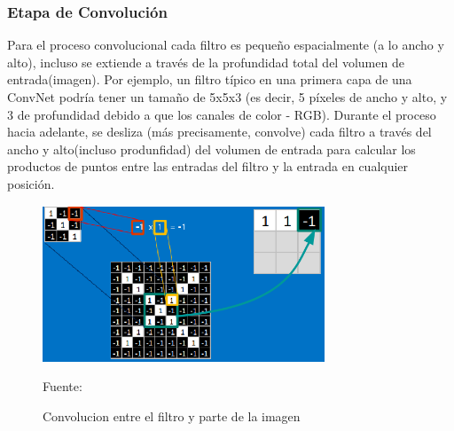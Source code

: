 		\subsubsection {Etapa de Convolución} 
		  
		Para el proceso convolucional cada filtro es pequeño espacialmente (a lo ancho y alto), incluso se extiende a través de la profundidad total del volumen de entrada(imagen). Por ejemplo, un filtro típico en una primera capa de una ConvNet podría tener un tamaño de 5x5x3 (es decir, 5 píxeles de ancho y alto, y 3 de profundidad debido a que los canales de color - RGB). Durante el proceso hacia adelante, se desliza (más precisamente, convolve) cada filtro a través del ancho y alto(incluso produnfidad) del volumen de entrada para calcular los productos de puntos entre las entradas del filtro y la entrada en cualquier posición.

		\begin{figure}[H]
		\begin{center}
		\includegraphics[width=0.75\textwidth]{images/marcoteorico/generate_filt1}
		\end{center}
		\begin{center}
		\caption{\small{Convolucion entre el filtro y parte de la imagen}}
		\vskip -0.25cm
		{\small{Fuente: \cite{Rohrer}}}
		\end{center}
		\vspace{-1.9em}
		\end{figure}

